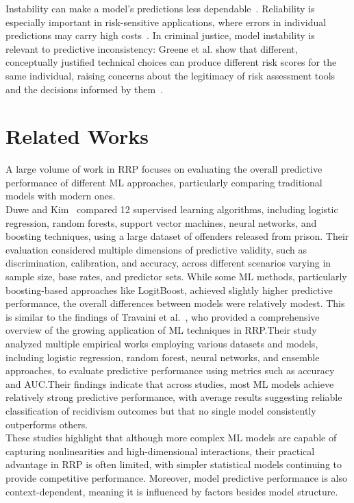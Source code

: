 \documentclass[12pt]{article}
\begin{document}
Instability can make a model's predictions less dependable~\cite{riley2023stability}. Reliability is especially important in risk-sensitive applications, where errors in individual predictions may carry high costs~\cite{zhang2024reliability}. In criminal justice, model instability is relevant to predictive inconsistency: Greene et al. show that different, conceptually justified technical choices can produce different risk scores for the same individual, raising concerns about the legitimacy of risk assessment tools and the decisions informed by them~\cite{greene2022forks}.

\section{Related Works}
\tabto{2em} A large volume of work in RRP focuses on evaluating the overall predictive performance of different ML approaches, particularly comparing traditional models with modern ones.\\

Duwe and Kim~\cite{duwe2017out} compared 12 supervised learning algorithms, including logistic regression, random forests, support vector machines, neural networks, and boosting techniques, using a large dataset of offenders released from prison. Their evaluation considered multiple dimensions of predictive validity, such as discrimination, calibration, and accuracy, across different scenarios varying in sample size, base rates, and predictor sets. While some ML methods, particularly boosting-based approaches like LogitBoost, achieved slightly higher predictive performance, the overall differences between models were relatively modest. This is similar to the findings of Travaini et al.~\cite{travaini2022machine}, who provided a comprehensive overview of the growing application of ML techniques in RRP.\@ Their study analyzed multiple empirical works employing various datasets and models, including logistic regression, random forest, neural networks, and ensemble approaches, to evaluate predictive performance using metrics such as accuracy and AUC.\@ Their findings indicate that across studies, most ML models achieve relatively strong predictive performance, with average results suggesting reliable classification of recidivism outcomes but that no single model consistently outperforms others.\\

These studies highlight that although more complex ML models are capable of capturing nonlinearities and high-dimensional interactions, their practical advantage in RRP is often limited, with simpler statistical models continuing to provide competitive performance. Moreover, model predictive performance is also context-dependent, meaning it is influenced by factors besides model structure.\\
\end{document}
